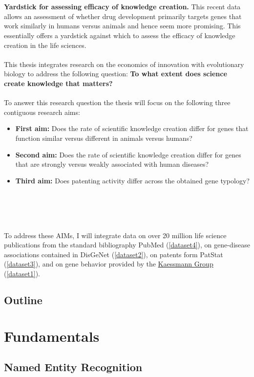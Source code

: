 \documentclass[11pt,titlepage,oneside,openany]{book}
\begin{document}
\\
\\
\textbf{Yardstick for assessing efficacy of knowledge creation.} This recent data allows an assessment of whether drug development primarily targets genes that work similarly in humans versus animals and hence seem more promising. This essentially offers a yardstick against which to assess the efficacy of knowledge creation in the life sciences.
\\
\\
This thesis integrates research on the economics of innovation with evolutionary biology to address the following question: \textbf{To what extent does science create knowledge that matters?}
\\
\\
To answer this research question the thesis will focus on the following three contiguous research aims:
\begin{itemize}
	\item \textbf{First aim:} Does the rate of scientific knowledge creation differ for genes that function similar versus different in animals versus humans?
	\item \textbf{Second aim:} Does the rate of scientific knowledge creation differ for genes that are strongly versus weakly associated with human diseases?
	\item \textbf{Third aim:} Does patenting activity differ across the obtained gene typology?
\end{itemize}
\\
\\
\\
\\
To address these AIMs, I will integrate data on over 20 million life science publications from the standard bibliography PubMed (\ref{dataset4}), on gene-disease associations contained in DisGeNet (\ref{dataset2}), on patents form PatStat (\ref{dataset3}), and on gene behavior provided by the \href{https://www.zmbh.uni-heidelberg.de/kaessmann/}{Kaessmann Group} (\ref{dataset1}).

\section{Outline}

\chapter{Fundamentals}

\section{Named Entity Recognition}
\end{document}
